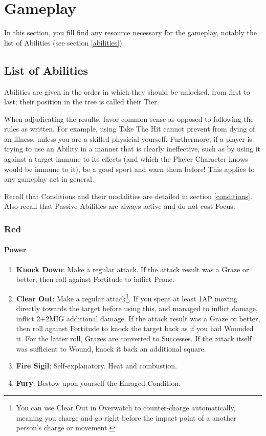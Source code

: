 \chapter{Gameplay}

In this section, you fill find any resource necessary for the gameplay, notably the list of Abilities (see section \ref{abilities}).

\section{List of Abilities}
\label{abilities_list}

Abilities are given in the order in which they should be unlocked, from first to last; their position in the tree is called their Tier. 

When adjudicating the results, favor common sense as opposed to following the rules as written. For example, using Take The Hit cannot prevent from dying of an illness, unless you are a skilled physicial yourself. Furthermore, if a player is trying to use an Ability in a manner that is clearly ineffective, such as by using it against a target immune to its effects (and which the Player Character knows would be immune to it), be a good sport and warn them before! This applies to any gameplay act in general.

Recall that Conditions and their modalities are detailed in section \ref{conditions}. Also recall that Passive Abilities are always active and do not cost Focus.

\subsection{Red}

\subsubsection{Power}
\begin{enumerate}
    \item \textbf{Knock Down}: Make a regular attack. If the attack result was a Graze or better, then roll against Fortitude to inflict Prone.
    \item \textbf{Clear Out}: Make a regular attack\footnote{You can use Clear Out in Overwatch to counter-charge automatically, meaning you charge and go right before the impact point of a another person's charge or movement.}. If you spent at least 1AP moving directly towards the target before using this, and managed to inflict damage, inflict 2+2\texttimes MIG additional damage. If the attack result was a Graze or better, then roll against Fortitude to knock the target back as if you had Wounded it. For the latter roll, Grazes are converted to Successes. If the attack itself was sufficient to Wound, knock it back an additional square.
    \item \textbf{Fire Sigil}: Self-explanatory. Heat and combustion.
    \item \textbf{Fury}: Bestow upon yourself the Enraged Condition.
\end{enumerate}


